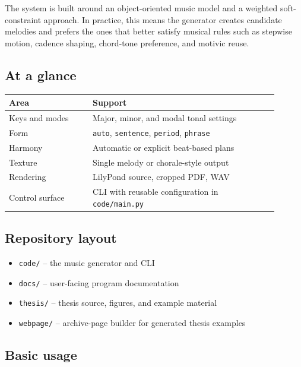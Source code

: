 \documentclass[a4paper,11pt]{article}
\begin{document}
The system is built around an object-oriented music model and a weighted soft-constraint approach. In practice, this means the generator creates candidate melodies and prefers the ones that better satisfy musical rules such as stepwise motion, cadence shaping, chord-tone preference, and motivic reuse.

\subsection*{At a glance}

\begin{center}
\small
\begin{tabular}{p{0.28\linewidth} p{0.62\linewidth}}
\toprule
Area & Support \\
\midrule
Keys and modes & Major, minor, and modal tonal settings \\
Form & \texttt{auto}, \texttt{sentence}, \texttt{period}, \texttt{phrase} \\
Harmony & Automatic or explicit beat-based plans \\
Texture & Single melody or chorale-style output \\
Rendering & LilyPond source, cropped PDF, WAV \\
Control surface & CLI with reusable configuration in \texttt{code/main.py} \\
\bottomrule
\end{tabular}
\normalsize
\end{center}

\subsection*{Repository layout}

\begin{itemize}

  \item \texttt{code/} -- the music generator and CLI

  \item \texttt{docs/} -- user-facing program documentation

  \item \texttt{thesis/} -- thesis source, figures, and example material

  \item \texttt{webpage/} -- archive-page builder for generated thesis examples

\end{itemize}

\subsection*{Basic usage}
\end{document}
